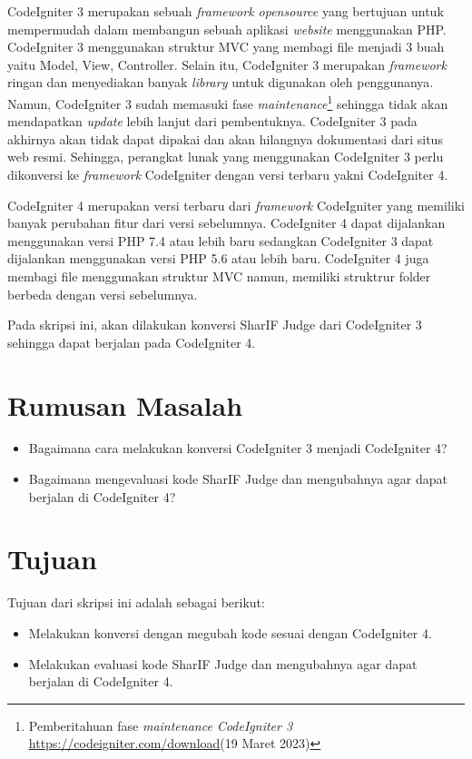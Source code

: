 CodeIgniter 3 merupakan sebuah \textit{framework opensource} yang bertujuan untuk mempermudah dalam membangun sebuah aplikasi \textit{website} menggunakan PHP. CodeIgniter 3 menggunakan struktur MVC yang membagi file menjadi 3 buah yaitu Model, View, Controller. Selain itu, CodeIgniter 3 merupakan \textit{framework} ringan dan menyediakan banyak \textit{library} untuk digunakan oleh penggunanya\cite{ci3:22}. Namun, CodeIgniter 3 sudah memasuki fase \textit{maintenance}\footnote{Pemberitahuan fase \textit{maintenance CodeIgniter 3} \url{https://codeigniter.com/download}(19 Maret 2023)} sehingga tidak akan mendapatkan \textit{update} lebih lanjut dari pembentuknya. CodeIgniter 3 pada akhirnya akan tidak dapat dipakai dan akan hilangnya dokumentasi dari situs web resmi. Sehingga, perangkat lunak yang menggunakan CodeIgniter 3 perlu dikonversi ke \textit{framework} CodeIgniter dengan versi terbaru yakni CodeIgniter 4.

CodeIgniter 4 merupakan versi terbaru dari \textit{framework} CodeIgniter yang memiliki banyak perubahan fitur dari versi sebelumnya. CodeIgniter 4 dapat dijalankan menggunakan versi PHP 7.4 atau lebih baru sedangkan CodeIgniter 3 dapat dijalankan menggunakan versi PHP 5.6 atau lebih baru. CodeIgniter 4 juga membagi file menggunakan struktur MVC namun, memiliki struktrur folder berbeda dengan versi sebelumnya\cite{codeigniter:23:ci4}.

Pada skripsi ini, akan dilakukan konversi SharIF Judge dari CodeIgniter 3 sehingga dapat berjalan pada CodeIgniter 4.

\section{Rumusan Masalah}
\label{sec:rumusan}
\begin{itemize}
	\item Bagaimana cara melakukan konversi CodeIgniter 3 menjadi CodeIgniter 4?
	\item Bagaimana mengevaluasi kode SharIF Judge dan mengubahnya agar dapat berjalan di CodeIgniter 4?
\end{itemize}
\section{Tujuan}
\label{sec:tujuan}
Tujuan dari skripsi ini adalah sebagai berikut:
\begin{itemize}
	\item Melakukan konversi dengan megubah kode sesuai dengan CodeIgniter 4.
	\item Melakukan evaluasi kode SharIF Judge dan mengubahnya agar dapat berjalan di CodeIgniter 4.
\end{itemize}

